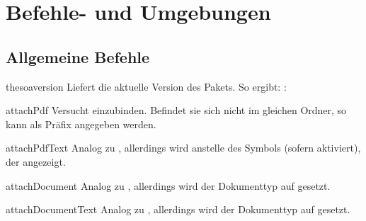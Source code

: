\documentclass{sopra-base}
\begin{document}
\section{Befehle- und Umgebungen}

\subsection{Allgemeine Befehle}

\begin{command}{thesoaversion}{}
    Liefert die aktuelle Version des Pakets. So ergibt: : \thesoaversion\\
\end{command}

\begin{command}{attachPdf}{}
    Versucht  einzubinden. Befindet sie sich nicht im gleichen Ordner, so kann
     als Präfix angegeben werden. 
\end{command}

\begin{command}{attachPdfText}{}
    Analog zu , allerdings wird anstelle des Symbols (sofern aktiviert),
    der  angezeigt.
\end{command}

\begin{command}{attachDocument}{}
    Analog zu , allerdings wird der Dokumenttyp auf  gesetzt. 
\end{command}

\begin{command}{attachDocumentText}{}
    Analog zu , allerdings wird der Dokumenttyp auf  gesetzt. 
\end{command}
\end{document}
